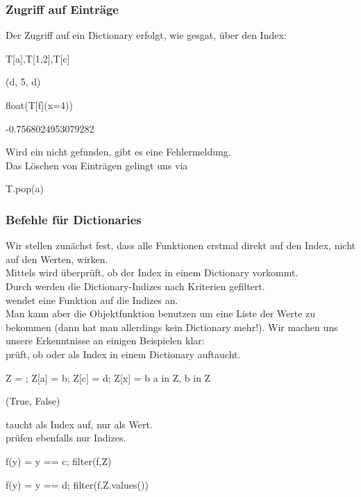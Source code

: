 \documentclass[fontsize=12pt,paper=a4,twoside,bibtotoc,idxtotoc,
liststotoc,pagesize,BCOR1.2cm,DIV15,chapterprefix,pagesize=pdftex]{scrbook}
\theoremstyle{plain}
\theoremstyle{definition}
\theoremstyle{remark}
\begin{document}
\subsubsection{Zugriff auf Einträge}
Der Zugriff auf ein Dictionary erfolgt, wie gesgat, über den Index:
\begin{sagein}
T[a],T[1,2],T[c]
\end{sagein}
\begin{sage}
(d, 5, d)
\end{sage}
\begin{sagein}
 float(T[f](x=4))
\end{sagein}
\begin{sage}
 -0.7568024953079282
\end{sage}
Wird ein  nicht gefunden, gibt es eine Fehlermeldung.\\
Das Löschen von Einträgen gelingt uns via 
\begin{sagein}
T.pop(a)
\end{sagein}
\subsubsection{Befehle für Dictionaries}
Wir stellen zunächst fest, dass alle Funktionen erstmal direkt auf den Index, nicht auf den Werten, wirken.\\
Mittels  wird überprüft, ob der Index  in einem Dictionary vorkommt.\\ 
Durch  werden die Dictionary-Indizes nach Kriterien gefiltert.\\
 wendet eine Funktion auf die Indizes an.\\
Man kann aber die Objektfunktion  benutzen um eine Liste der Werte zu bekommen (dann hat man allerdings kein Dictionary mehr!).
Wir machen uns unsere Erkenntnisse an einigen Beispielen klar:\\
 prüft, ob  oder  als Index in einem Dictionary auftaucht.
\begin{sagein}
Z = {}; Z[a] = b; Z[c] = d; Z[x] = b
a in Z, b in Z
\end{sagein}
\begin{sage}
(True, False)
\end{sage}
 taucht als Index auf,  nur als Wert.\\
 prüfen ebenfalls nur Indizes.
\begin{sagein}
f(y) = y == c; filter(f,Z)
\end{sagein}
\begin{sage}
[c]
\end{sage}
\begin{sagein}
f(y) = y == d; filter(f,Z.values())
\end{sagein}
\begin{sage}
[d]
\end{sage}
\end{document}
